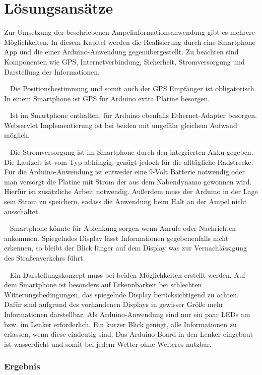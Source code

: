 \chapter{Lösungsansätze}
Zur Umsetzung der beschriebenen Ampelinformationsanwendung gibt es mehrere Möglichkeiten. In diesem Kapitel werden die Realisierung durch eine Smartphone App und die einer \gls{Arduino}-Anwendung gegenübergestellt. Zu beachten sind Komponenten wie \gls{GPS}, Internetverbindung, Sicherheit, Stromversorgung und Darstellung der Informationen.\\
\begin{description}[leftmargin=1cm,style=nextline]
  \item[\gls{GPS}-Empfänger] ~ Die Positionsbestimmung und somit auch der \gls{GPS} Empfänger ist obligatorisch. In einem Smartphone ist GPS für \gls{Arduino} extra Platine besorgen.\\
  \item[Internetverbindung] ~ Ist im Smartphone enthalten, für \gls{Arduino} ebenfalls Ethernet-Adapter besorgen. Webservlet Implementierung ist bei beiden mit ungefähr gleichem Aufwand möglich.\\
  \item[Stromversorgung] ~ Die Stromversorgung ist im Smartphone durch den integrierten Akku gegeben. Die Laufzeit ist vom Typ abhängig, genügt jedoch für die alltägliche Radstrecke. Für die \gls{Arduino}-Anwendung ist entweder eine 9-Volt Batterie notwendig oder man versorgt die Platine mit Strom der aus dem Nabendynamo gewonnen wird. Hierfür ist zusätzliche Arbeit notwendig. Außerdem muss der \gls{Arduino} in der Lage sein Strom zu speichern, sodass die Anwendung beim Halt an der Ampel nicht ausschaltet.\\
  \item[Verkehrssicherheit] ~ Smartphone könnte für Ablenkung sorgen wenn Anrufe oder Nachrichten ankommen. Spiegelndes Display lässt Informationen gegebenenfalls nicht erkennen, so bleibt der Blick länger auf dem Display was zur Vernachlässigung des Straßenverkehrs führt.\\ 
  \item[Darstellung] ~ Ein Darstellungskonzept muss bei beiden Möglichkeiten erstellt werden. Auf dem Smartphone ist besonders auf Erkennbarkeit bei schlechten Witterungsbedingungen, das spiegelnde Display berücksichtigend zu achten. Dafür sind aufgrund des vorhandenen Displays in gewisser Größe mehr Informationen darstellbar. Als \gls{Arduino}-Anwendung sind nur ein paar \glspl{LED} am bzw. im Lenker erforderlich. Ein kurzer Blick genügt, alle Informationen zu erfassen, wenn diese eindeutig sind. Das \gls{Arduino}-Board in den Lenker eingebaut ist wasserdicht und somit bei jedem Wetter ohne Weiteres nutzbar.\\
\end{description}

\subsection*{Ergebnis}  
